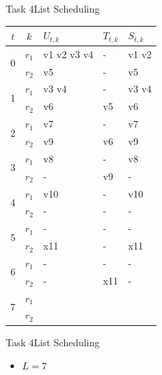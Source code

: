 \begin{frame}{Task 4}{List Scheduling}
  \begin{solutionnoinc}
    \centering
    \tiny
    \begin{tabular}{c|c|l|l|l|}
    \hline$t$ & $k$ & $U_{t, k}$ & $T_{t, k}$ & $S_{t, k}$ \\
    \hline \multirow{2}{*}{0} & $r_1$ & v1 v2 v3 v4 & - & v1 v2 \\
    \cline { 2 - 5 } & $r_2$ & v5 & - & v5 \\
    \hline \multirow{2}{*}{1} & $r_1$ & v3 v4 & - & v3 v4 \\
    \cline { 2 - 5 } & $r_2$ & v6 & v5 & v6 \\
    \hline \multirow{2}{*}{2} & $r_1$ & v7 & - & v7 \\
    \cline { 2 - 5 } & $r_2$ & v9 & v6 & v9 \\
    \hline \multirow{2}{*}{3} & $r_1$ & v8 & - & v8 \\
    \cline { 2 - 5 } & $r_2$ & - & v9 & - \\
    \hline \multirow{2}{*}{4} & $r_1$ & v10 & - & v10 \\
    \cline { 2 - 5 }  & $r_2$ & - & - & - \\
    \hline \multirow{2}{*}{5} & $r_1$ & - & - & - \\
    \cline { 2 - 5 } & $r_2$ & x11 & - & x11 \\
    \hline \multirow{2}{*}{6} & $r_1$ & - & - & - \\
    \cline { 2 - 5 } & $r_2$ & - & x11 & - \\
    \hline \multirow{2}{*}{7} & $r_1$ & & & \\
    \cline { 2 - 5 } & $r_2$ & & & \\
    \hline
    \end{tabular}
  \end{solutionnoinc}
\end{frame}

\begin{frame}{Task 4}{List Scheduling}
  \begin{solution}
    \begin{itemize}
      \item $L=7$
    \end{itemize}
  \end{solution}
\end{frame}

